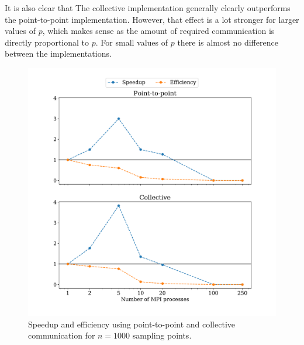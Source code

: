 \documentclass[a4paper, 11pt]{article}
\begin{document}
It is also clear that The collective implementation generally clearly
outperforms the point-to-point implementation. However, that effect is a lot
stronger for larger values of $p$, which makes sense as the amount of required
communication is directly proportional to $p$. For small values of $p$ there is
almost no difference between the implementations.

\begin{figure}
  \centering
  \includegraphics[width=\textwidth]{../trapezoid/plot/1000.pdf}
  \caption{Speedup and efficiency using point-to-point and collective communication for $n=1000$ sampling points.}
  \label{fig:1_n_1000}
\end{figure}
\end{document}
